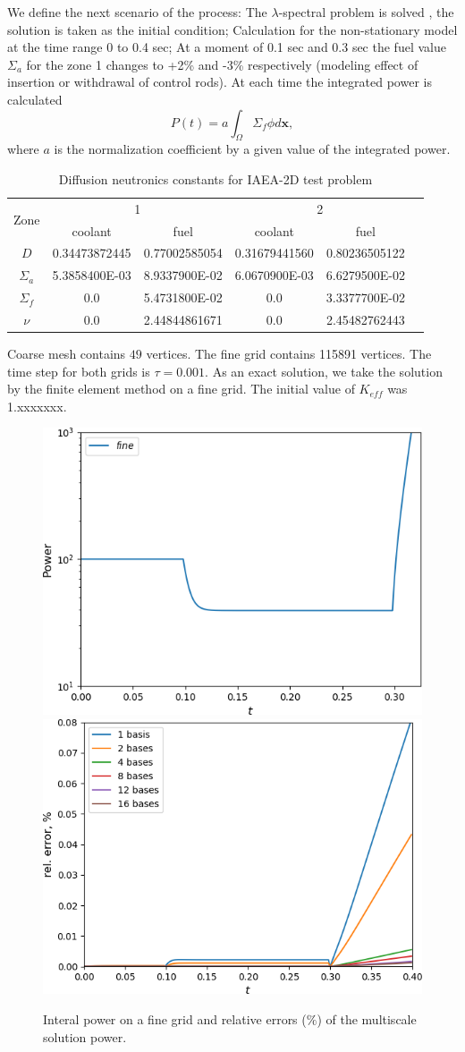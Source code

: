 \documentclass[runningheads]{llncs}
\begin{document}
We define the next scenario of the process: The $\lambda$-spectral problem is solved \cite{Annals17}, the solution is taken as the initial condition; 
Calculation for the non-stationary model at the time range 0 to 0.4 sec;
At a moment of 0.1 sec and 0.3 sec the fuel value $\Sigma_a$ for the zone 1 changes to +2\% and -3\% respectively (modeling effect of insertion or withdrawal of control rods).
At each time the integrated power is calculated 
\[P(t) = a\int_{\Omega}\Sigma_f \phi d\bm x,\]
where $a$ is the normalization coefficient by a given value of the integrated power.

\begin{table}[h]
\caption{Diffusion neutronics constants for IAEA-2D test problem}
\label{t1}
\begin{center}
\begin{tabular}{|c|c|c|c|c|c|}
\hline
\multirow{2}{*}{Zone} & \multicolumn{2}{c|}{1} & \multicolumn{2}{c|}{2} \\
\cline{2-5}
& coolant & fuel & coolant & fuel \\
\hline
$D$ & 0.34473872445 & 0.77002585054 & 0.31679441560 & 0.80236505122 \\
$\Sigma_a$ & 5.3858400E-03 & 8.9337900E-02 & 6.0670900E-03 & 6.6279500E-02 \\
$\Sigma_{f}$ & 0.0 & 5.4731800E-02 & 0.0 & 3.3377700E-02 \\
$\nu$ & 0.0 & 2.44844861671 & 0.0 & 2.45482762443 \\
\hline
\end{tabular}
\end{center}
\end{table}

Coarse mesh contains $49$ vertices.
The fine grid contains 115891 vertices. 
The time step for both grids is $\tau = 0.001$.
As an exact solution, we take the solution by the finite element method on a fine grid.
The initial value of $K_{eff}$ was 1.xxxxxxx. 

\begin{figure}[h!]
\centering
\includegraphics[width=0.45\linewidth]{power_fine.png} 
\hspace{2em}
\includegraphics[width=0.45\linewidth]{power.png} 
\caption{Interal power on a fine grid and relative errors ($\%$) of the multiscale solution power.}
\label{p4}
\end{figure}
 
\end{document}
